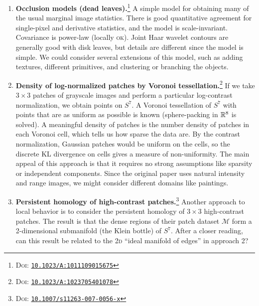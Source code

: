 \documentclass[../notebook.tex]{subfiles}
\begin{document}
\begin{enumerate}
  \item \textbf{Occlusion models (dead leaves).}\footnote{\textsc{Doi}:
    \href{https://doi.org/10.1023/A:1011109015675}{\texttt{10.1023/A:1011109015675}}}\@
    A simple model for obtaining many of the usual marginal image statistics.
    There is good quantitative agreement for single-pixel and derivative
    statistics, and the model is scale-invariant. Covariance is power-law
    (locally \textsc{ok}). Joint Haar wavelet contours are generally good with
    disk leaves, but details are different since the model is simple. We could
    consider several extensions of this model, such as adding textures,
    different primitives, and clustering or branching the objects.

  \item \textbf{Density of log-normalized patches by Voronoi
      tessellation.}\footnote{\textsc{Doi}:
    \href{https://doi.org/10.1023/A:1023705401078}{\texttt{10.1023/A:1023705401078}}}\@
    If we take $3 \times 3$ patches of grayscale images and perform a particular
    log-contrast normalization, we obtain points on $S^7$. A Voronoi tessellation
    of $S^7$ with points that are as uniform as possible is known
    (sphere-packing in $\mathbb{R}^8$ is solved). A meaningful density of patches is
    the number density of patches in each Voronoi cell, which tells us how
    sparse the data are. By the contrast normalization, Gaussian patches would
    be uniform on the cells, so the discrete KL divergence on cells gives a
    measure of non-uniformity. The main appeal of this approach is that it
    requires no strong assumptions like sparsity or independent components.
    Since the original paper uses natural intensity and range images, we might
    consider different domains like paintings.

  \item \textbf{Persistent homology of high-contrast patches.}\footnote{\textsc{Doi}:
    \href{https://doi.org/10.1007/s11263-007-0056-x}{\texttt{10.1007/s11263-007-0056-x}}}\@
    Another approach to local behavior is to consider the persistent homology of
    $3 \times 3$ high-contrast patches. The result is that the dense regions of
    their patch dataset $\mathcal{M}$ form a 2-dimensional submanifold (the
    Klein bottle) of $S^7$. After a closer reading, can this result be related
    to the \textsc{2d} ``ideal manifold of edges'' in approach 2?


\end{enumerate}
\end{document}
